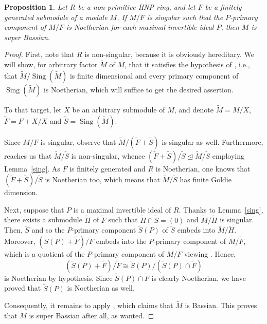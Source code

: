 \documentclass{amsart}
\newtheorem{prop}[thm]{Proposition}
\theoremstyle{definition}
\DeclareMathOperator{\Sing}{{Sing}}
\begin{document}
\begin{prop}\label{HNP} Let $R$ be a non-primitive HNP ring, and let $F$ be a finitely generated submodule of a module $M$. If $M/F$ is singular such that the $P$-primary component of $M/F$ is Noetherian for each maximal invertible ideal $P$, then $M$ is super Bassian.
\end{prop}

\begin{proof} First, note that $R$ is non-singular, because it is obviously hereditary. We will show, for arbitrary factor $\tilde{M}$ of $M$, that it satisfies the hypothesis of \cite[Theorem 3]{T}, i.e., that $\tilde{M}/\Sing(\tilde{M})$ is finite dimensional and every primary component of $\Sing(\tilde{M})$ is Noetherian, which will suffice to get the desired assertion.

To that target, let $X$ be an arbitrary submodule of $M$, and denote $\tilde{M}=M/X$, $\tilde{F}=F+X/X$ and
$\tilde{S}=\Sing(\tilde{M})$.

Since $M/F$ is singular, observe that $\tilde{M}/(\tilde{F}+\tilde{S})$ is singular as well. Furthermore, \cite[Proposition 1.1]{T} reaches us that $\tilde{M}/\tilde{S}$ is non-singular, whence
$(\tilde{F}+\tilde{S})/\tilde{S} \trianglelefteq\tilde{M}/\tilde{S}$ employing Lemma~\ref{sing}. As $F$ is finitely generated and $R$ is Noetherian, one knows that $(\tilde{F}+\tilde{S})/\tilde{S}$ is Noetherian too, which means that $\tilde{M}/\tilde{S}$ has finite Goldie dimension.

Next, suppose that $P$ is a maximal invertible ideal of $R$. Thanks to Lemma~\ref{sing}, there exists a submodule $\tilde{H}$ of $\tilde{F}$ such that $\tilde{H}\cap \tilde{S}=(0)$ and $\tilde{M}/\tilde{H}$ is singular. Then, $\tilde{S}$ and so the $P$-primary component $\tilde{S}(P)$ of $\tilde{S}$ embeds into $\tilde{M}/\tilde{H}$. Moreover, $(\tilde{S}(P)+\tilde{F})/\tilde{F}$ embeds into the $P$-primary component of $\tilde{M}/\tilde{F}$, which is a quotient of the $P$-primary component of $M/F$ viewing \cite[Remark 8]{T}. Hence, $$(\tilde{S}(P)+\tilde{F})/\tilde{F}\cong \tilde{S}(P)/(\tilde{S}(P)\cap \tilde{F})$$ is Noetherian by hypothesis. Since $\tilde{S}(P)\cap \tilde{F}$ is clearly Noetherian, we have proved that $\tilde{S}(P)$ is Noetherian as well.

Consequently, it remains to apply \cite[Theorem 3]{T}, which claims that $\tilde{M}$ is Bassian. This proves that $M$ is super Bassian after all, as wanted.
\end{proof}
\end{document}
